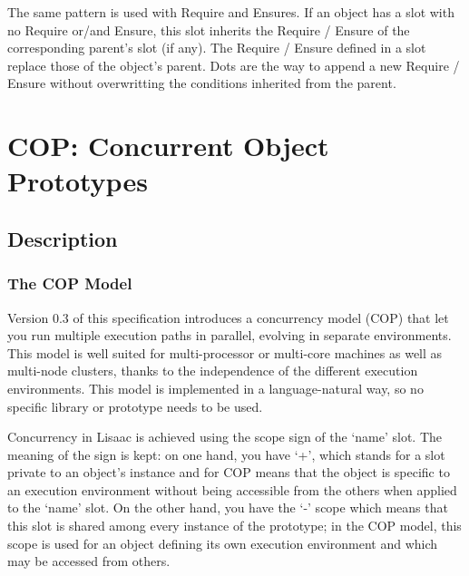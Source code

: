 \documentclass[11pt]{mybook}
\begin{document}
The same pattern is used with Require and Ensures.
If an object has a slot with no Require or/and Ensure, this slot inherits the Require / Ensure of the corresponding parent's slot (if any).
The Require / Ensure defined in a slot replace those of the object's parent.
Dots are the way to append a new Require / Ensure without overwritting the conditions inherited from the parent.

\section{COP: Concurrent Object Prototypes}
%
\label{COP}

\subsection{Description}

\subsubsection{The COP Model}

Version 0.3 of this specification introduces a concurrency model (COP)
that let you run multiple execution paths in parallel, evolving in
separate environments.  This model is well suited for multi-processor
or multi-core machines as well as multi-node clusters, thanks to the
independence of the different execution environments.  This model is
implemented in a language-natural way, so no specific library or
prototype needs to be used.  

Concurrency in Lisaac is achieved using the scope sign of the `name'
slot. 
The meaning of the sign is kept: on one hand, you have `+', which
stands for a slot private to an object's instance and for COP means that
the object is specific to an execution environment without being
accessible from the others when applied to the `name' slot.  On the
other hand, you have the `-' scope which means that this slot is
shared among every instance of the prototype; in the COP model, this
scope is used for an object defining its own execution environment and
which may be accessed from others. 
\end{document}
